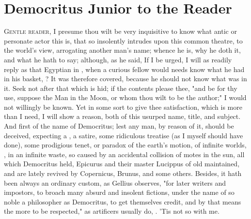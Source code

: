 \chapter{Democritus Junior to the Reader}
\lettrine[lines=4,findent=5pt,nindent=0pt]{G}{entle reader}, I presume thou
wilt be very inquisitive to know what antic or personate actor this is, that so
insolently intrudes upon this common theatre, to the world's view, arrogating
another man's name; whence he is, why he doth it, and what he hath to say;
although, as he said,  If I be urged, I will as readily reply as that Egyptian in
, when a curious fellow would needs know what he had
in his basket, ? It
was therefore covered, because he should not know what was in it. Seek not
after that which is hid; if the contents please thee, "and be
for thy use, suppose the Man in the Moon, or whom thou wilt to be the author;"
I would not willingly be known. Yet in some sort to give thee satisfaction,
which is more than I need, I will show a reason, both of this usurped name,
title, and subject. And first of the name of Democritus; lest any man, by
reason of it, should be deceived, expecting a , a satire, some
ridiculous treatise (as I myself should have done), some prodigious tenet, or
paradox of the earth's motion, of infinite worlds, , in an infinite waste, so caused by an accidental
collision of motes in the sun, all which Democritus held, Epicurus and their
master Lucippus of old maintained, and are lately revived by Copernicus,
Brunus, and some others. Besides, it hath been always an ordinary custom, as
Gellius observes, "for later writers and impostors, to
broach many absurd and insolent fictions, under the name of so noble a
philosopher as Democritus, to get themselves credit, and by that means the more
to be respected," as artificers usually do, . 'Tis not so with me.



